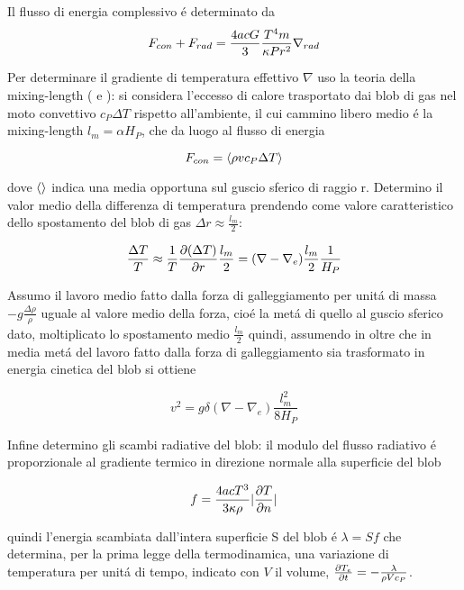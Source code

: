 \documentclass[../main.tex]{subfiles}
\begin{document}
Il flusso di energia complessivo \'e determinato da
\begin{equation}
F_{con}+F_{rad}=\frac{4acG}{3}\frac{T^4m}{\kappa Pr^2}\nrad{}\label{eq:totalflux}
\end{equation}

Per determinare il gradiente di temperatura effettivo $\nabla$ uso la teoria della mixing-length (\cite{prandtl25tur} e \cite{vitense53kon}):
si considera l'eccesso di calore trasportato dai blob di gas nel moto convettivo $c_P\Delta T$ rispetto all'ambiente, il cui cammino libero medio \'e la mixing-length $l_m=\alpha H_P$, che da luogo al flusso di energia

\begin{equation}
F_{con}=\exv{\rho vc_P\Delta T}\label{eq:convectiveflux}
\end{equation}

dove $\exv{}$ indica una media opportuna sul guscio sferico di raggio r. Determino il valor medio della differenza di temperatura prendendo come valore caratteristico dello spostamento del blob di gas $\Delta r\approx\frac{l_m}{2}$:

\begin{equation}
\frac{\Delta T}{T}\approx\frac{1}{T}\PDy{r}{(\Delta T)}\frac{l_m}{2}=(\nabla-\nabla_e)\frac{l_m}{2}\frac{1}{H_P}
\end{equation}

Assumo il lavoro medio fatto dalla forza di galleggiamento per unit\'a di massa $-g\frac{\Delta\rho}{\rho}$ uguale al valore medio della forza, cio\'e la met\'a di quello al guscio sferico dato, moltiplicato lo spostamento medio $\frac{l_m}{2}$ quindi, assumendo in oltre che in media met\'a del lavoro fatto dalla forza di galleggiamento sia trasformato in energia cinetica del blob si ottiene

\begin{equation}
v^2=g\delta(\nabla-\nabla_e)\frac{l_m^2}{8H_P}\label{eq:blobvelocity}
\end{equation}

Infine determino gli scambi radiative del blob: il modulo del flusso radiativo \'e proporzionale al gradiente termico in direzione normale alla superficie del blob

\begin{equation}
f=\frac{4acT^3}{3\kappa\rho}|\PDy{n}{T}|
\end{equation}

quindi l'energia scambiata dall'intera superficie S del blob \'e $\lambda=Sf$ che determina, per la prima legge della termodinamica, una variazione di temperatura per unit\'a di tempo, indicato con $V$ il volume, $\PDy{t}{T_e}=-\frac{\lambda}{\rho Vc_P}$.
\end{document}
